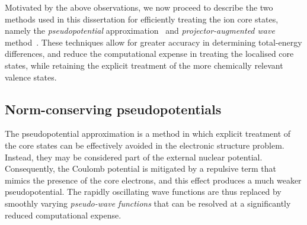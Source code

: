 %
Motivated by the above observations, 
we now proceed to describe the two methods 
used in this dissertation 
for efficiently treating the ion core states, 
namely the {\it pseudopotential} 
approximation~\cite{HEINE19701,PhysRev.112.685,PhysRev.116.287}
and {\it projector-augmented wave} method~\cite{PhysRevB.50.17953,PhysRevB.59.1758}.
%
These techniques 
{allow for greater accuracy 
in determining total-energy differences}, 
and reduce 
the computational expense in 
treating the localised core states, 
while retaining the explicit 
treatment of the more 
chemically relevant valence states.

\subsection{Norm-conserving pseudopotentials}
%
The pseudopotential approximation 
is a method 
in which explicit treatment of the core states 
can be effectively avoided in the 
electronic structure problem.
% 
{Instead, 
they may be} considered part of 
the external nuclear potential.
%
Consequently, the Coulomb potential 
is mitigated by a repulsive 
term that mimics the presence of 
the core electrons, 
{and this effect produces} a much weaker 
pseudopotential.
%
The rapidly oscillating wave functions 
are thus replaced by smoothly varying 
\emph{pseudo-wave functions} 
that can be resolved at a significantly reduced 
computational expense.
%

